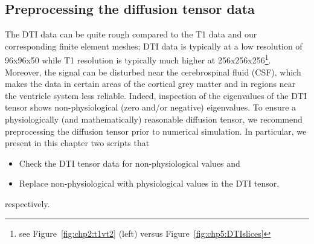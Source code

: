 \subsection{Preprocessing the diffusion tensor data}

The DTI data can be quite rough compared to the T1 data and our
corresponding finite element meshes; DTI data is typically at a low resolution 
of 96x96x50 while T1 resolution is typically much higher at 
256x256x256\footnote{see Figure~\ref{fig:chp2:t1vt2} (left) versus 
Figure~\ref{fig:chp5:DTIslices}}. Moreover, the signal can be disturbed near 
the cerebrospinal fluid (CSF), which makes the data in certain areas of the 
cortical grey matter and in regions near the ventricle system less reliable. 
Indeed, inspection of the eigenvalues of the DTI tensor shows 
non-physiological (zero and/or negative) eigenvalues. To ensure a 
physiologically (and mathematically) reasonable diffusion tensor, we recommend 
preprocessing the diffusion tensor prior to numerical simulation. In 
particular, we present in this chapter two scripts that
\begin{itemize}
\item
  Check the DTI tensor data for non-physiological values and
\item
  Replace non-physiological with physiological values in the DTI tensor,
\end{itemize}
respectively.

